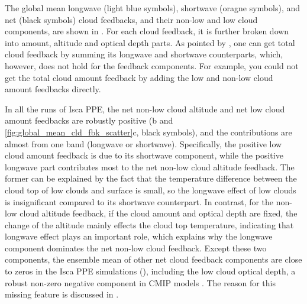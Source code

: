 The global mean longwave (light blue symbols), shortwave (oragne symbols), and net (black symbols) cloud feedbacks, and their non-low and low cloud components, are shown in . For each cloud feedback, it is further broken down into amount, altitude and optical depth parts. As pointed by \cite{Zelinka2012computing2}, one can get total cloud feedback by summing its longwave and shortwave counterparts, which, however, does not hold for the feedback components. For example, you could not get the total cloud amount feedback by adding the low and non-low cloud amount feedbacks directly.

In all the runs of Isca PPE, the net non-low cloud altitude and net low cloud amount feedbacks are robustly positive (b and \ref{fig:global_mean_cld_fbk_scatter}c, black symbols), and the contributions are almost from one band (longwave or shortwave). Specifically, the positive low cloud amount feedback is due to its shortwave component, while the positive longwave part contributes most to the net non-low cloud altitude feedback. The former can be explained by the fact that the temperature difference between the cloud top of low clouds and surface is small, so the longwave effect of low clouds is insignificant compared to its shortwave counterpart. In contrast, for the non-low cloud altitude feedback, if the cloud amount and optical depth are fixed, the change of the altitude mainly effects the cloud top temperature, indicating that longwave effect plays an important role, which explains why the longwave component dominates the net non-low cloud feedback. Except these two components, the ensemble mean of other net cloud feedback components are close to zeros in the Isca PPE simulations (), including the low cloud optical depth, a robust non-zero negative component in CMIP models \citep[e.g.,][]{Zelinka2016insights,Ceppi2017,Zelinka2020causes}. The reason for this missing feature is discussed in .


